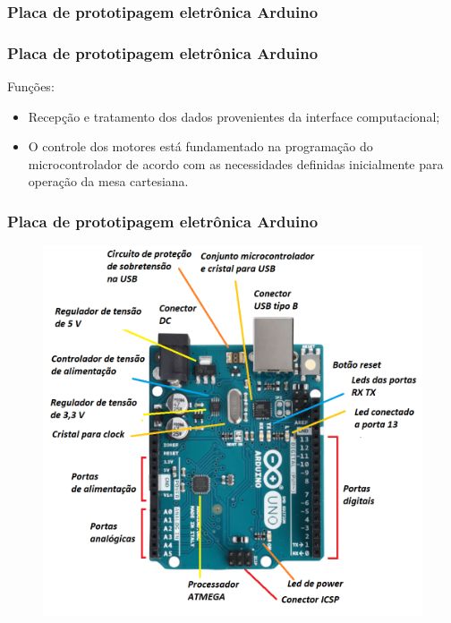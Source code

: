 \subsubsection{Placa de prototipagem eletrônica Arduino}

\begin{frame}
\frametitle{Placa de prototipagem eletrônica Arduino}

Funções:
\begin{itemize}
    \item Recepção e tratamento dos dados provenientes da interface computacional;
    \item O controle dos motores está fundamentado na programação do microcontrolador de acordo com as necessidades definidas inicialmente para operação da mesa cartesiana.
\end{itemize}

\end{frame}
    
\begin{frame}
\frametitle{Placa de prototipagem eletrônica Arduino}

\begin{figure}
\centering
\includegraphics[scale = 0.20]{figuras/placaarduino}
\end{figure}

\end{frame}

